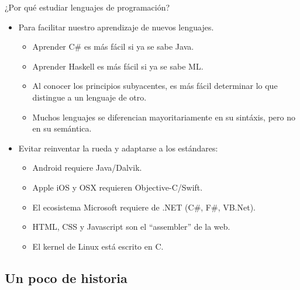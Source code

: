 \documentclass{beamer} %
\begin{document}
\begin{frame}{¿Por qué estudiar lenguajes de programación?}
    \begin{itemize}
      \item<1-> Para facilitar nuestro aprendizaje de nuevos lenguajes.
      \begin{itemize}
          \item Aprender C\# es más fácil si ya se sabe Java.
          \item Aprender Haskell es más fácil si ya se sabe ML.
          \item Al conocer los principios subyacentes, es más fácil determinar lo que distingue a un lenguaje de otro.
          \item Muchos lenguajes se diferencian mayoritariamente en su sintáxis, pero no en su semántica.
      \end{itemize}
      \item<2-> Evitar reinventar la rueda y adaptarse a los estándares:
      \begin{itemize}
          \item Android requiere Java/Dalvik.
          \item Apple iOS y OSX requieren Objective-C/Swift.
          \item El ecosistema Microsoft requiere de .NET (C\#, F\#, VB.Net).
          \item HTML, CSS y Javascript son el ``assembler'' de la web.
          \item El kernel de Linux está escrito en C.
      \end{itemize}
    \end{itemize}
\end{frame}

\subsection{Un poco de historia}
\end{document}
